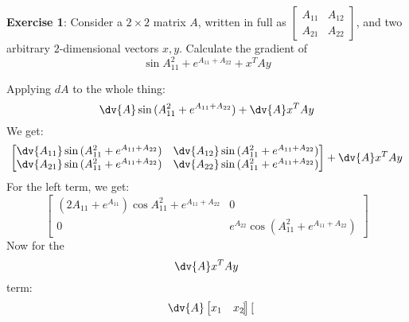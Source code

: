 \documentclass{article}
\begin{document}
\textbf{Exercise 1}: Consider a $2 \times 2$ matrix $A$, written in full as $\begin{bmatrix}
    A_{11} & A_{12} \\
    A_{21} & A_{22}   
\end{bmatrix}$, and two arbitrary $2$-dimensional vectors $x, y$. Calculate the gradient of
    \begin{equation*}
        \sin{A^{2}_{11} + e^{A_{11} + A_{22}}} + x^{T}Ay
    \end{equation*}
    \begin{answer}
        Applying $dA$ to the whole thing:
            \begin{equation*}
                \dv{A} \sin{(A_{11}^{2} + e^{A_{11} + A_{22}})} + \dv{A} x^{T}Ay
            \end{equation*}
        We get:
            \begin{equation*}
                \begin{bmatrix}
                    \dv{A_{11}} \sin{(A_{11}^{2} + e^{A_{11} + A_{22}})} & \dv{A_{12}} \sin{(A_{11}^{2} + e^{A_{11} + A_{22}})} \\
                    \dv{A_{21}} \sin{(A_{11}^{2} + e^{A_{11} + A_{22}})} & \dv{A_{22}} \sin{(A_{11}^{2} + e^{A_{11} + A_{22}})}   
                \end{bmatrix} + \dv{A} x^{T}Ay
            \end{equation*}
        For the left term, we get:
            \begin{equation*}
                \begin{bmatrix}
                    (2A_{11} + e^{A_{11}})\cos{A_{11}^{2} + e^{A_{11} + A_{22}}} & 0                                                  \\
                    0                                                            & e^{A_{22}}\cos{(A_{11}^{2} + e^{A_{11} + A_{22}})}   
                \end{bmatrix}
            \end{equation*}
        Now for the 
            \begin{equation*}
                \dv{A} x^{T} Ay
            \end{equation*}
        term:
            \begin{align*}
                \dv{A} \begin{bmatrix}
                    x_{1} & x_{2}   
                \end{bmatrix} \begin{bmatrix}

\end{bmatrix}
\end{align*}
\end{answer}
\end{document}
